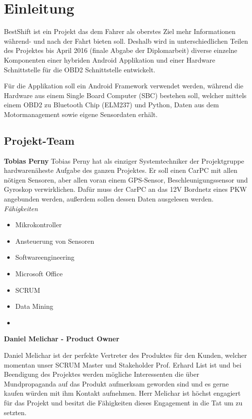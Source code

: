 \chapter{Einleitung}
BestShift ist ein Projekt das dem Fahrer als oberstes Ziel mehr Informationen während- und nach der Fahrt bieten soll. Deshalb wird in unterschiedlichen Teilen des Projektes bis April 2016 (finale Abgabe der Diplomarbeit) diverse einzelne Komponenten einer hybriden Android Applikation und einer Hardware Schnittstelle für die OBD2 Schnittstelle entwickelt. 

Für die Applikation soll ein Android Framework verwendet werden, während die Hardware aus einem Single Board Computer (SBC) bestehen soll, welcher mittels einem OBD2 zu Bluetooth Chip (ELM237) und Python, Daten aus dem Motormanagement sowie eigene Sensordaten erhält. 

\section{Projekt-Team}
\textbf{Tobias Perny}
Tobias Perny hat als einziger Systemtechniker der Projektgruppe hardwarenäheste Aufgabe des ganzen Projektes. Er soll einen CarPC mit allen nötigen Sensoren, aber allen voran einem GPS-Sensor, Beschleunigungssensor und Gyroskop verwirklichen. Dafür muss der CarPC an das 12V Bordnetz eines PKW angebunden werden, außerdem sollen dessen Daten ausgelesen werden.
\nextline 
\textit{Fähigkeiten}
\begin{itemize}
	\item Mikrokontroller
	\item Ansteuerung von Sensoren		
	\item Softwareengineering
	\item Microsoft Office
	\item SCRUM
	\item Data Mining
	\item {}
\end{itemize}

\textbf{Daniel Melichar - Product Owner}

Daniel Melichar ist der perfekte Vertreter des Produktes für den Kunden, welcher momentan unser SCRUM Master und Stakeholder Prof. Erhard List ist und bei Beendigung des Projektes werden mögliche Interessenten die über Mundpropaganda auf das Produkt aufmerksam geworden sind und es gerne kaufen würden mit ihm Kontakt aufnehmen. Herr Melichar ist höchst engagiert für das Projekt und besitzt die Fähigkeiten dieses Engagement in die Tat um zu setzten.

